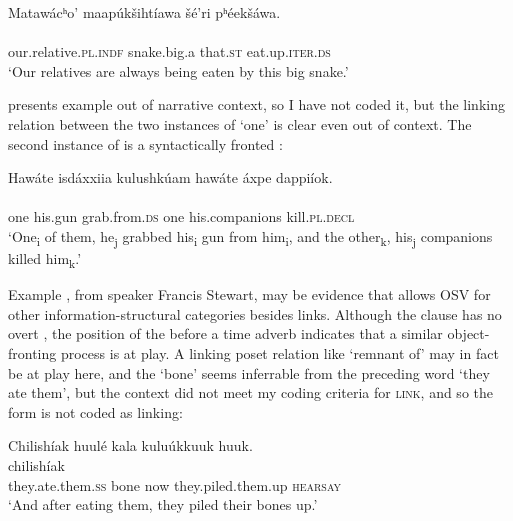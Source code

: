 \documentclass[output=paper]{LSP/langsci}
\begin{document}
\ea\label{eagleosv}
Matawácʰo’ maapúkšihtíawa šé’ri pʰéekšáwa.\rmfnm\\
\gll	{}		 	 	\\
	our.relative.\textsc{pl.indf} 		snake.big.a 			that.\textsc{st} 	eat.up.\textsc{iter.ds}\\
\glt	`Our relatives are always being eaten by this big snake.'
\z


\citet[102]{Graczyk1991a} presents  example  out of narrative context, so I have not coded it, but the linking relation between the two instances of  `one' is clear even out of context. The second instance of  is a syntactically fronted :
\largerpage[2]

\ea\label{apsaalookeosv}
	Hawáte isdáxxiia kulushkúam hawáte áxpe dappiíok.\\
\gll	{} 	 				 	 			\\
	one 		his.gun 	grab.from.\textsc{ds} 	one 		his.companions	kill.\textsc{pl.decl}\\
\glt	`One\textsubscript{i} of them, he\textsubscript{j} grabbed his\textsubscript{i} gun from him\textsubscript{i}, and the other\textsubscript{k}, his\textsubscript{j} companions killed him\textsubscript{k}.'
\z

Example , from speaker Francis Stewart, may be evidence that  allows OSV for other information-structural categories besides links. Although the clause  has no overt , the position of the  before a time adverb indicates that a similar object-fronting process is at play. A linking poset relation like `remnant of' may in fact be at play here, and the  `bone' seems inferrable from the preceding word  `they ate them', but the context did not meet my coding criteria for \textsc{link}, and so the form is not coded as linking:

\ea\label{stewartosv}
Chilishíak huulé kala kuluúkkuuk huuk.\rmfnm\\
\gll	chilishíak 							\\
	they.ate.them.\textsc{ss} 	bone 			now 			they.piled.them.up 		\textsc{hearsay}\\
\glt	`And after eating them, they piled their bones up.'
\z
\end{document}
